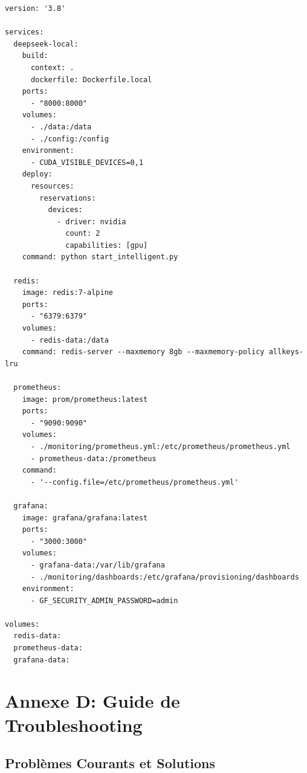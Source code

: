 \documentclass[12pt,a4paper]{article}
\begin{document}
\begin{lstlisting}[caption={docker-compose.yml}]
version: '3.8'

services:
  deepseek-local:
    build:
      context: .
      dockerfile: Dockerfile.local
    ports:
      - "8000:8000"
    volumes:
      - ./data:/data
      - ./config:/config
    environment:
      - CUDA_VISIBLE_DEVICES=0,1
    deploy:
      resources:
        reservations:
          devices:
            - driver: nvidia
              count: 2
              capabilities: [gpu]
    command: python start_intelligent.py

  redis:
    image: redis:7-alpine
    ports:
      - "6379:6379"
    volumes:
      - redis-data:/data
    command: redis-server --maxmemory 8gb --maxmemory-policy allkeys-lru

  prometheus:
    image: prom/prometheus:latest
    ports:
      - "9090:9090"
    volumes:
      - ./monitoring/prometheus.yml:/etc/prometheus/prometheus.yml
      - prometheus-data:/prometheus
    command:
      - '--config.file=/etc/prometheus/prometheus.yml'

  grafana:
    image: grafana/grafana:latest
    ports:
      - "3000:3000"
    volumes:
      - grafana-data:/var/lib/grafana
      - ./monitoring/dashboards:/etc/grafana/provisioning/dashboards
    environment:
      - GF_SECURITY_ADMIN_PASSWORD=admin

volumes:
  redis-data:
  prometheus-data:
  grafana-data:
\end{lstlisting}

\section{Annexe D: Guide de Troubleshooting}

\subsection{Problèmes Courants et Solutions}
\end{document}
